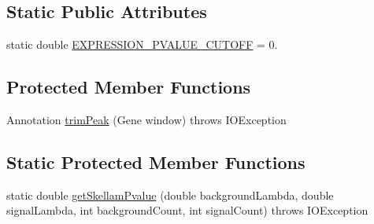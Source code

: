 \subsection*{Static Public Attributes}
\begin{DoxyCompactItemize}
\item 
static double \hyperlink{classbroad_1_1pda_1_1seq_1_1protection_1_1_two_sample_scan_skellam_peak_caller_a80993f62a710f524ecd2d07addd746e6}{E\+X\+P\+R\+E\+S\+S\+I\+O\+N\+\_\+\+P\+V\+A\+L\+U\+E\+\_\+\+C\+U\+T\+O\+F\+F} = 0.
\end{DoxyCompactItemize}
\subsection*{Protected Member Functions}
\begin{DoxyCompactItemize}
\item 
Annotation \hyperlink{classbroad_1_1pda_1_1seq_1_1protection_1_1_two_sample_scan_skellam_peak_caller_a621b926377563490f9b0136021ec0dc1}{trim\+Peak} (Gene window)  throws I\+O\+Exception 
\end{DoxyCompactItemize}
\subsection*{Static Protected Member Functions}
\begin{DoxyCompactItemize}
\item 
static double \hyperlink{classbroad_1_1pda_1_1seq_1_1protection_1_1_two_sample_scan_skellam_peak_caller_afcdd15bdc7980bb781b093eae3951104}{get\+Skellam\+Pvalue} (double background\+Lambda, double signal\+Lambda, int background\+Count, int signal\+Count)  throws I\+O\+Exception 
\end{DoxyCompactItemize}
